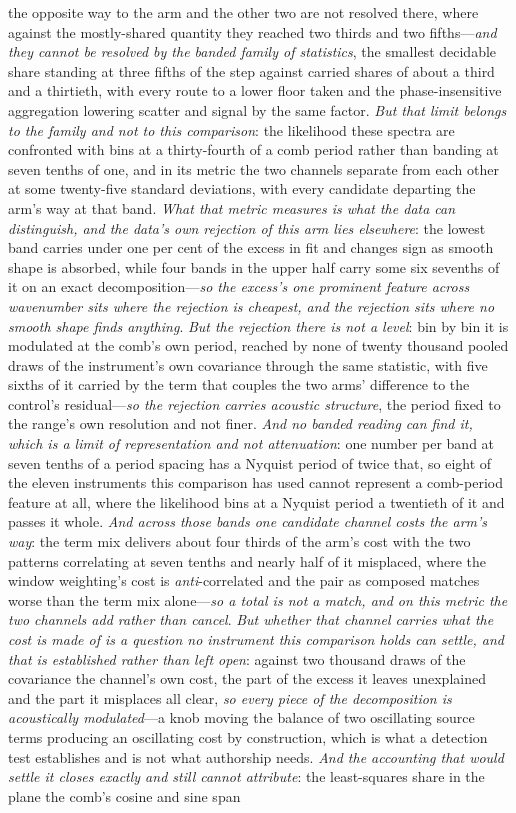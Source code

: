 \documentclass[11pt,a4paper]{article}
\theoremstyle{plain}
\theoremstyle{definition}
\theoremstyle{remark}
\begin{document}
\begin{enumerate}
the opposite way to the arm and the other two are not resolved there, where against the mostly-shared quantity they reached two thirds and two fifths---\emph{and they cannot be resolved by the banded family of statistics}, the smallest decidable share standing at three fifths of the step against carried shares of about a third and a thirtieth, with every route to a lower floor taken and the phase-insensitive aggregation lowering scatter and signal by the same factor. \emph{But that limit belongs to the family and not to this comparison}: the likelihood these spectra are confronted with bins at a thirty-fourth of a comb period rather than banding at seven tenths of one, and in its metric the two channels separate from each other at some twenty-five standard deviations, with every candidate departing the arm's way at that band. \emph{What that metric measures is what the data can distinguish, and the data's own rejection of this arm lies elsewhere}: the lowest band carries under one per cent of the excess in fit and changes sign as smooth shape is absorbed, while four bands in the upper half carry some six sevenths of it on an exact decomposition---\emph{so the excess's one prominent feature across wavenumber sits where the rejection is cheapest, and the rejection sits where no smooth shape finds anything}. \emph{But the rejection there is not a level}: bin by bin it is modulated at the comb's own period, reached by none of twenty thousand pooled draws of the instrument's own covariance through the same statistic, with five sixths of it carried by the term that couples the two arms' difference to the control's residual---\emph{so the rejection carries acoustic structure}, the period fixed to the range's own resolution and not finer. \emph{And no banded reading can find it, which is a limit of representation and not attenuation}: one number per band at seven tenths of a period spacing has a Nyquist period of twice that, so eight of the eleven instruments this comparison has used cannot represent a comb-period feature at all, where the likelihood bins at a Nyquist period a twentieth of it and passes it whole. \emph{And across those bands one candidate channel costs the arm's way}: the term mix delivers about four thirds of the arm's cost with the two patterns correlating at seven tenths and nearly half of it misplaced, where the window weighting's cost is \emph{anti}-correlated and the pair as composed matches worse than the term mix alone---\emph{so a total is not a match, and on this metric the two channels add rather than cancel}. \emph{But whether that channel carries what the cost is made of is a question no instrument this comparison holds can settle, and that is established rather than left open}: against two thousand draws of the covariance the channel's own cost, the part of the excess it leaves unexplained and the part it misplaces all clear, \emph{so every piece of the decomposition is acoustically modulated}---a knob moving the balance of two oscillating source terms producing an oscillating cost by construction, which is what a detection test establishes and is not what authorship needs. \emph{And the accounting that would settle it closes exactly and still cannot attribute}: the least-squares share in the plane the comb's cosine and sine span 
\end{enumerate}
\end{document}
